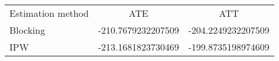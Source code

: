 \begin{center}
\begin{tabular}{lcc}
\hline\hline
Estimation method & ATE & ATT \\ [0.5ex]
Blocking & -210.7679232207509 & -204.2249232207509 \\ 
IPW              & -213.1681823730469   & -199.8735198974609 \\ 
\hline\hline
\end{tabular}
\end{center}

